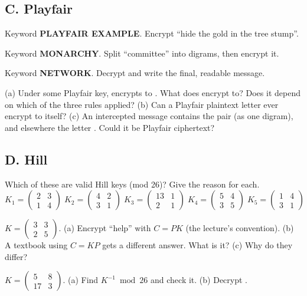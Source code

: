 \subsection*{C. Playfair}

\q Keyword \textbf{PLAYFAIR EXAMPLE}. Encrypt ``hide the gold in the tree stump''.

\q Keyword \textbf{MONARCHY}. Split ``committee'' into digrams, then encrypt it.

\q Keyword \textbf{NETWORK}. Decrypt  and write the final, readable message.

\q (a) Under some Playfair key,  encrypts to . What does  encrypt to? Does it depend on which of the three rules applied?
(b) Can a Playfair plaintext letter ever encrypt to itself?
(c) An intercepted message contains the pair  (as one digram), and elsewhere the letter . Could it be Playfair ciphertext?

\subsection*{D. Hill}

\q Which of these are valid Hill keys (mod 26)? Give the reason for each.
\[
K_1=\begin{pmatrix}2&3\\1&4\end{pmatrix}\;
K_2=\begin{pmatrix}4&2\\3&1\end{pmatrix}\;
K_3=\begin{pmatrix}13&1\\2&1\end{pmatrix}\;
K_4=\begin{pmatrix}5&4\\3&5\end{pmatrix}\;
K_5=\begin{pmatrix}1&4\\3&1\end{pmatrix}
\]

\q $K=\begin{pmatrix}3&3\\2&5\end{pmatrix}$. (a) Encrypt ``help'' with $C = PK$ (the lecture's convention).
(b) A textbook using $C = KP$ gets a different answer. What is it? (c) Why do they differ?

\q $K=\begin{pmatrix}5&8\\17&3\end{pmatrix}$. (a) Find $K^{-1} \bmod 26$ and check it. (b) Decrypt .

